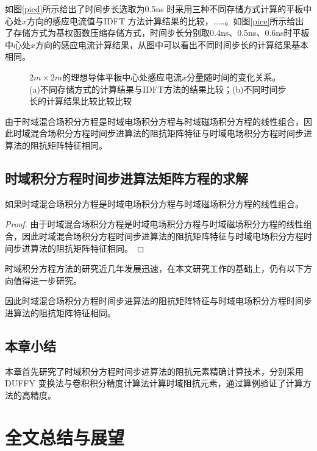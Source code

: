 \documentclass[master]{thesis-uestc}
\begin{document}
如图\ref{picd}所示给出了时间步长选取为0.5ns 时采用三种不同存储方式计算的平板中心处$x$方向的感应电流值与IDFT 方法计算结果的比较，……。如图\ref{pice}所示给出了存储方式为基权函数压缩存储方式，时间步长分别取0.4ns、0.5ns、0.6ns时平板中心处$x$方向的感应电流计算结果，从图中可以看出不同时间步长的计算结果基本相同。

\begin{figure}[h]
\caption{$2m\times 2m$的理想导体平板中心处感应电流$x$分量随时间的变化关系。(a)不同存储方式的计算结果与IDFT方法的结果比较；(b)不同时间步长的计算结果比较比较比较}
\label{fig2}
\end{figure}

由于时域混合场积分方程是时域电场积分方程与时域磁场积分方程的线性组合，因此时域混合场积分方程时间步进算法的阻抗矩阵特征与时域电场积分方程时间步进算法的阻抗矩阵特征相同。

\section{时域积分方程时间步进算法矩阵方程的求解}
\begin{theorem}
如果时域混合场积分方程是时域电场积分方程与时域磁场积分方程的线性组合。
\end{theorem}
\begin{proof}
由于时域混合场积分方程是时域电场积分方程与时域磁场积分方程的线性组合，因此时域混合场积分方程时间步进算法的阻抗矩阵特征与时域电场积分方程时间步进算法的阻抗矩阵特征相同。
\end{proof}
\begin{corollary}
时域积分方程方法的研究近几年发展迅速，在本文研究工作的基础上，仍有以下方向值得进一步研究。
\end{corollary}
\begin{lemma}
因此时域混合场积分方程时间步进算法的阻抗矩阵特征与时域电场积分方程时间步进算法的阻抗矩阵特征相同。
\end{lemma}

\section{本章小结}
本章首先研究了时域积分方程时间步进算法的阻抗元素精确计算技术，分别采用DUFFY 变换法与卷积积分精度计算法计算时域阻抗元素，通过算例验证了计算方法的高精度。

\chapter{全文总结与展望}
\end{document}
